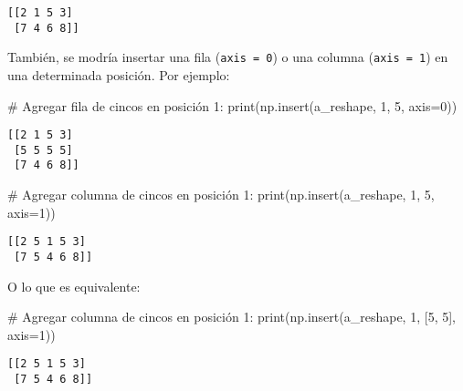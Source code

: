 \documentclass[
  letterpaper,
  DIV=11,
  numbers=noendperiod]{scrreprt}
\newenvironment{Shaded}{\begin{snugshade}}{\end{snugshade}}
\newcommand{\BuiltInTok}[1]{\textcolor[rgb]{0.00,0.23,0.31}{#1}}
\newcommand{\CommentTok}[1]{\textcolor[rgb]{0.37,0.37,0.37}{#1}}
\newcommand{\DecValTok}[1]{\textcolor[rgb]{0.68,0.00,0.00}{#1}}
\newcommand{\NormalTok}[1]{\textcolor[rgb]{0.00,0.23,0.31}{#1}}
\newcommand{\OperatorTok}[1]{\textcolor[rgb]{0.37,0.37,0.37}{#1}}
\begin{document}
\begin{verbatim}
[[2 1 5 3]
 [7 4 6 8]]
\end{verbatim}

También, se modría insertar una fila (\texttt{axis\ =\ 0}) o una columna
(\texttt{axis\ =\ 1}) en una determinada posición. Por ejemplo:

\begin{Shaded}
\begin{Highlighting}[]
\CommentTok{\# Agregar fila de cincos en posición 1:}
\BuiltInTok{print}\NormalTok{(np.insert(a\_reshape, }\DecValTok{1}\NormalTok{, }\DecValTok{5}\NormalTok{, axis}\OperatorTok{=}\DecValTok{0}\NormalTok{))}
\end{Highlighting}
\end{Shaded}

\begin{verbatim}
[[2 1 5 3]
 [5 5 5 5]
 [7 4 6 8]]
\end{verbatim}

\begin{Shaded}
\begin{Highlighting}[]
\CommentTok{\# Agregar columna de cincos en posición 1:}
\BuiltInTok{print}\NormalTok{(np.insert(a\_reshape, }\DecValTok{1}\NormalTok{, }\DecValTok{5}\NormalTok{, axis}\OperatorTok{=}\DecValTok{1}\NormalTok{))}
\end{Highlighting}
\end{Shaded}

\begin{verbatim}
[[2 5 1 5 3]
 [7 5 4 6 8]]
\end{verbatim}

O lo que es equivalente:

\begin{Shaded}
\begin{Highlighting}[]
\CommentTok{\# Agregar columna de cincos en posición 1:}
\BuiltInTok{print}\NormalTok{(np.insert(a\_reshape, }\DecValTok{1}\NormalTok{, [}\DecValTok{5}\NormalTok{, }\DecValTok{5}\NormalTok{], axis}\OperatorTok{=}\DecValTok{1}\NormalTok{))}
\end{Highlighting}
\end{Shaded}

\begin{verbatim}
[[2 5 1 5 3]
 [7 5 4 6 8]]
\end{verbatim}
\end{document}
